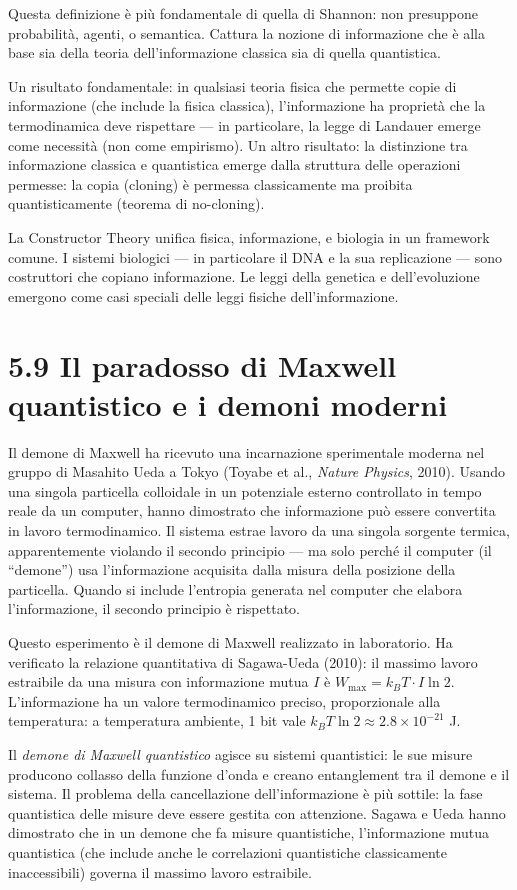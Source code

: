 \documentclass[11.5pt,a4paper,openany]{book}
\theoremstyle{remark}
\begin{document}
Questa definizione è più fondamentale di quella di Shannon: non presuppone probabilità, agenti, o semantica. Cattura la nozione di informazione che è alla base sia della teoria dell'informazione classica sia di quella quantistica.

Un risultato fondamentale: in qualsiasi teoria fisica che permette copie di informazione (che include la fisica classica), l'informazione ha proprietà che la termodinamica deve rispettare --- in particolare, la legge di Landauer emerge come necessità (non come empirismo). Un altro risultato: la distinzione tra informazione classica e quantistica emerge dalla struttura delle operazioni permesse: la copia (cloning) è permessa classicamente ma proibita quantisticamente (teorema di no-cloning).

La Constructor Theory unifica fisica, informazione, e biologia in un framework comune. I sistemi biologici --- in particolare il DNA e la sua replicazione --- sono costruttori che copiano informazione. Le leggi della genetica e dell'evoluzione emergono come casi speciali delle leggi fisiche dell'informazione.

\section{5.9 Il paradosso di Maxwell quantistico e i demoni moderni}

Il demone di Maxwell ha ricevuto una incarnazione sperimentale moderna nel gruppo di Masahito Ueda a Tokyo (Toyabe et al., \textit{Nature Physics}, 2010). Usando una singola particella colloidale in un potenziale esterno controllato in tempo reale da un computer, hanno dimostrato che informazione può essere convertita in lavoro termodinamico. Il sistema estrae lavoro da una singola sorgente termica, apparentemente violando il secondo principio --- ma solo perché il computer (il ``demone'') usa l'informazione acquisita dalla misura della posizione della particella. Quando si include l'entropia generata nel computer che elabora l'informazione, il secondo principio è rispettato.

Questo esperimento è il demone di Maxwell realizzato in laboratorio. Ha verificato la relazione quantitativa di Sagawa-Ueda (2010): il massimo lavoro estraibile da una misura con informazione mutua $I$ è $W_{\max} = k_B T \cdot I \ln 2$. L'informazione ha un valore termodinamico preciso, proporzionale alla temperatura: a temperatura ambiente, 1 bit vale $k_B T \ln 2 \approx 2.8 \times 10^{-21}$ J.

Il \textit{demone di Maxwell quantistico} agisce su sistemi quantistici: le sue misure producono collasso della funzione d'onda e creano entanglement tra il demone e il sistema. Il problema della cancellazione dell'informazione è più sottile: la fase quantistica delle misure deve essere gestita con attenzione. Sagawa e Ueda hanno dimostrato che in un demone che fa misure quantistiche, l'informazione mutua quantistica (che include anche le correlazioni quantistiche classicamente inaccessibili) governa il massimo lavoro estraibile.
\end{document}
